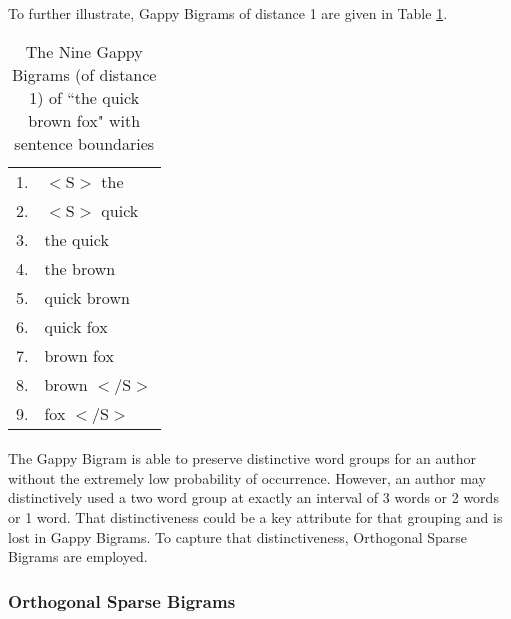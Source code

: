 		To further illustrate, Gappy Bigrams of distance 1 are given in Table \ref{table:1gappybigrams}.
		
		\begin{center}
			\begin{table}[h]
				\begin{center}
					\begin{tabular}{ r l }
					1. & $<\text{S}>$ the\\
					2. & $<\text{S}>$ quick\\
					3. & the quick\\
					4. & the brown\\
					5. & quick brown\\
					6. & quick fox\\
					7. & brown fox\\
					8. & brown $<\text{/S}>$\\
					9. & fox $<\text{/S}>$\\
					\end{tabular}
					\caption{The Nine Gappy Bigrams (of distance 1) of ``the quick brown fox" with sentence boundaries}
					\label{table:1gappybigrams}
				\end{center}
			\end{table}
		\end{center}

		\paragraph{}  The Gappy Bigram is able to preserve distinctive word groups for an author without the extremely low probability of occurrence.  However, an author may distinctively used a two word group at exactly an interval of 3 words or 2 words or 1 word.  That distinctiveness could be a key attribute for that grouping and is lost in Gappy Bigrams.  To capture that distinctiveness, Orthogonal Sparse Bigrams are employed.

	\subsubsection{Orthogonal Sparse Bigrams}
